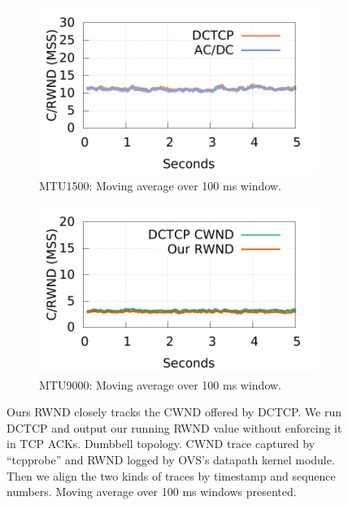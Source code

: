 \begin{figure}[!htb]
        \centering
        \begin{subfigure}[b]{0.225\textwidth}
                \centering
                \includegraphics[width=\textwidth]{figures/cwnd_rwnd/moving-ave/measure_cwnd_rwnd_gap_15k_5flows_ave100.pdf}
                \caption{MTU1500: Moving average over 100 ms window.}
                \label{cwnd_rwnd_1500_0sec}
        \end{subfigure}
        \begin{subfigure}[b]{0.225\textwidth}
                \centering
                \includegraphics[width=\textwidth]{figures/cwnd_rwnd/moving-ave/measure_cwnd_rwnd_gap_9k_5flows_ave100.pdf}
                \caption{MTU9000: Moving average over 100 ms window.}
                \label{cwnd_rwnd_1500_2sec}
        \end{subfigure}

        \caption{Ours RWND closely tracks the CWND offered by DCTCP. We run DCTCP and output our running RWND value
                without enforcing it in TCP ACKs. Dumbbell topology. CWND trace captured by ``tcpprobe'' and
                RWND logged by OVS's datapath kernel module. Then we align the two kinds of traces by timestamp and sequence numbers.
		Moving average over 100 ms windows presented.}
        \label{compare_cwnd_rwnd_ave}
\end{figure}


